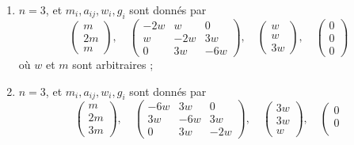 \begin{lemma}[Genre un]
\begin{enumerate}
$$\begin{matrix}
w & w & -2w
\end{matrix}
\right),
\quad
\left(
\begin{matrix}
w \\
w \\
w
\end{matrix}
\right),
\quad
\left(
\begin{matrix}
0 \\
0 \\
0
\end{matrix}
\right)
$$
où $w$ et $m$ sont arbitraires ;
\item
\label{item-equal-up3}
$n = 3$, et $m_i, a_{ij}, w_i, g_i$ sont donnés par
$$
\left(
\begin{matrix}
m \\
2m \\
m
\end{matrix}
\right),
\quad
\left(
\begin{matrix}
-2w & w & 0 \\
w & -2w & 3w \\
0 & 3w & -6w
\end{matrix}
\right),
\quad
\left(
\begin{matrix}
w \\
w \\
3w
\end{matrix}
\right),
\quad
\left(
\begin{matrix}
0 \\
0 \\
0
\end{matrix}
\right)
$$
où $w$ et $m$ sont arbitraires ;
\item
\label{item-equal-down3}
$n = 3$, et $m_i, a_{ij}, w_i, g_i$ sont donnés par
$$
\left(
\begin{matrix}
m \\
2m \\
3m
\end{matrix}
\right),
\quad
\left(
\begin{matrix}
-6w & 3w & 0 \\
3w & -6w & 3w \\
0 & 3w & -2w
\end{matrix}
\right),
\quad
\left(
\begin{matrix}
3w \\
3w \\
w
\end{matrix}
\right),
\quad
\left(
\begin{matrix}
0 \\
0 \\

\end{matrix}$$
\end{enumerate}
\end{lemma}
